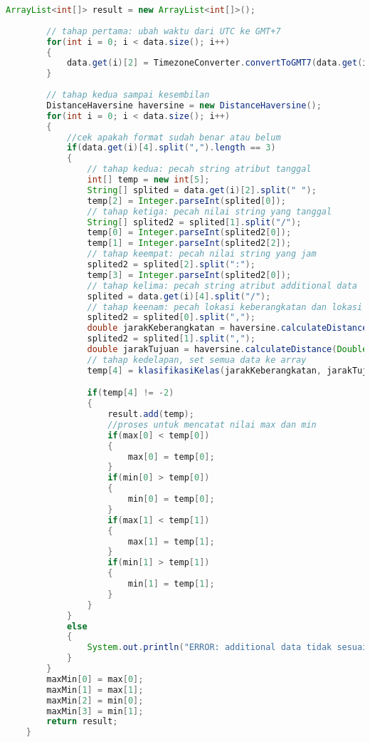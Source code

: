 \begin{lstlisting}[language=Java,basicstyle=\tiny,caption=ProcessingData.java]
        ArrayList<int[]> result = new ArrayList<int[]>();
        
        // tahap pertama: ubah waktu dari UTC ke GMT+7
        for(int i = 0; i < data.size(); i++)
        {
            data.get(i)[2] = TimezoneConverter.convertToGMT7(data.get(i)[2]);
        }
        
        // tahap kedua sampai kesembilan
        DistanceHaversine haversine = new DistanceHaversine();
        for(int i = 0; i < data.size(); i++)
        {
            //cek apakah format sudah benar atau belum
            if(data.get(i)[4].split(",").length == 3)
            {
                // tahap kedua: pecah string atribut tanggal
                int[] temp = new int[5];
                String[] splited = data.get(i)[2].split(" ");
                temp[2] = Integer.parseInt(splited[0]);
                // tahap ketiga: pecah nilai string yang tanggal
                String[] splited2 = splited[1].split("/");
                temp[0] = Integer.parseInt(splited2[0]);
                temp[1] = Integer.parseInt(splited2[2]);
                // tahap keempat: pecah nilai string yang jam
                splited2 = splited[2].split(":");
                temp[3] = Integer.parseInt(splited2[0]);
                // tahap kelima: pecah string atribut additional data
                splited = data.get(i)[4].split("/");
                // tahap keenam: pecah lokasi keberangkatan dan lokasi tujuan untuk mendapatkan lat n lon dan (ini tahap ketujuh) menghitung jarak terhadap titik pusat
                splited2 = splited[0].split(",");
                double jarakKeberangkatan = haversine.calculateDistance(Double.parseDouble(splited2[0]), Double.parseDouble(splited2[1]), -6.916667,107.6) * 1000;
                splited2 = splited[1].split(",");
                double jarakTujuan = haversine.calculateDistance(Double.parseDouble(splited2[0]), Double.parseDouble(splited2[1]), -6.916667,107.6) * 1000;
                // tahap kedelapan, set semua data ke array
                temp[4] = klasifikasiKelas(jarakKeberangkatan, jarakTujuan);

                if(temp[4] != -2)
                {
                    result.add(temp);
                    //proses untuk mencatat nilai max dan min
                    if(max[0] < temp[0])
                    {
                        max[0] = temp[0];
                    }
                    if(min[0] > temp[0])
                    {
                        min[0] = temp[0];
                    }
                    if(max[1] < temp[1])
                    {
                        max[1] = temp[1];
                    }
                    if(min[1] > temp[1])
                    {
                        min[1] = temp[1];
                    }
                }
            }
            else
            {
                System.out.println("ERROR: additional data tidak sesuai; " + data.get(i)[4]);
            }
        }
        maxMin[0] = max[0];
        maxMin[1] = max[1];
        maxMin[2] = min[0];
        maxMin[3] = min[1];
        return result;
    }
    

\end{lstlisting}
